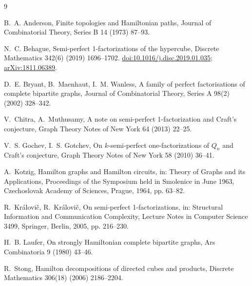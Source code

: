 \documentclass[preprint,12pt]{elsarticle}
\begin{document}
\begin{thebibliography}{9}

B.~A. Anderson,
Finite topologies and Hamiltonian paths,
Journal of Combinatorial Theory, Series B 14 (1973) 87--93.

N.~C. Behague,
Semi-perfect 1-factorizations of the hypercube,
Discrete Mathematics 342(6) (2019) 1696--1702.
\href{https://doi.org/10.1016/j.disc.2019.01.035}{doi:10.1016/j.disc.2019.01.035};
\href{https://arxiv.org/abs/1811.06389}{arXiv:1811.06389}.

D.~E. Bryant, B.~Maenhaut, I.~M. Wanless,
A family of perfect factorisations of complete bipartite graphs,
Journal of Combinatorial Theory, Series A 98(2) (2002) 328--342.

V.~Chitra, A.~Muthusamy,
A note on semi-perfect 1-factorization and Craft's conjecture,
Graph Theory Notes of New York 64 (2013) 22--25.

V.~S. Gochev, I.~S. Gotchev,
On \(k\)-semi-perfect one-factorizations of \(Q_n\) and Craft's conjecture,
Graph Theory Notes of New York 58 (2010) 36--41.

A.~Kotzig,
Hamilton graphs and Hamilton circuits,
in: Theory of Graphs and its Applications, Proceedings of the Symposium held
in Smolenice in June 1963, Czechoslovak Academy of Sciences, Prague, 1964,
pp. 63--82.

R.~Kr\'alovi\v{c}, R.~Kr\'alovi\v{c},
On semi-perfect 1-factorizations,
in: Structural Information and Communication Complexity, Lecture Notes in
Computer Science 3499, Springer, Berlin, 2005, pp. 216--230.

H.~B. Laufer,
On strongly Hamiltonian complete bipartite graphs,
Ars Combinatoria 9 (1980) 43--46.

R.~Stong,
Hamilton decompositions of directed cubes and products,
Discrete Mathematics 306(18) (2006) 2186--2204.

\end{thebibliography}
\end{document}
